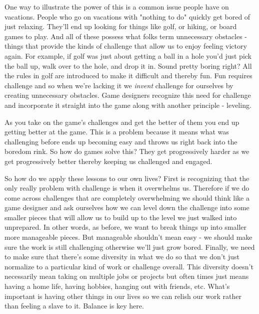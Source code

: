 \documentclass[11pt,a5paper]{book}
\begin{document}
One way to illustrate the power of this is a common issue people have on vacations. People who go on vacations with "nothing to do" quickly get bored of just relaxing. They'll end up looking for things like golf, or hiking, or board games to play. And all of these possess what folks term unnecessary obstacles \cite{superbetter} - things that provide the kinds of challenge that allow us to enjoy feeling victory again. For example, if golf was just about getting a ball in a hole you'd just pick the ball up, walk over to the hole, and drop it in. Sound pretty boring right? All the rules in golf are introduced to make it difficult and thereby fun. Fun requires challenge and so when we're lacking it we \textit{invent} challenge for ourselves by creating unnecessary obstacles. Game designers recognize this need for challenge and incorporate it straight into the game along with another principle - leveling.
\newline

As you take on the game's challenges and get the better of them you end up getting better at the game. This is a problem because it means what was challenging before ends up becoming easy and throws us right back into the boredom rink. So how do games solve this? They get progressively harder as we get progressively better thereby keeping us challenged and engaged.
\newline

So how do we apply these lessons to our own lives? First is recognizing that the only really problem with challenge is when it overwhelms us. Therefore if we do come across challenges that are completely overwhelming we should think like a game designer and ask ourselves how we can level down the challenge into some smaller pieces that will allow us to build up to the level we just walked into unprepared. In other words, as before, we want to break things up into smaller more manageable pieces. But manageable shouldn't mean easy - we should make sure the work is still challenging otherwise we'll just grow bored. Finally, we need to make sure that there's some diversity in what we do so that we don't just normalize to a particular kind of work or challenge overall. This diversity doesn't necessarily mean taking on multiple jobs or projects but often times just means having a home life, having hobbies, hanging out with friends, etc. What's important is having other things in our lives so we can relish our work rather than feeling a slave to it. Balance is key here. 
\newline
\end{document}
